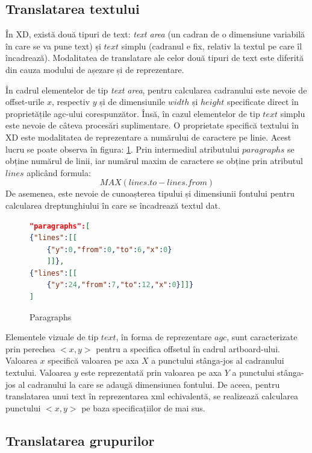\subsection{Translatarea textului}

În XD, există două tipuri de text: \textit{text area} (un cadran de o dimensiune variabilă în care se va pune text) și $text$ simplu (cadranul e fix, relativ la textul pe care îl încadrează). Modalitatea de translatare ale celor două tipuri de text este diferită din cauza modului de așezare și de reprezentare. 

În cadrul elementelor de tip \textit{text area}, pentru calcularea cadranului este nevoie de offset-urile $x$, respectiv $y$ și de dimensiunile $width$ și $height$ specificate direct în proprietățile agc-ului corespunzător. Însă, în cazul elementelor de tip $text$ simplu este nevoie de câteva procesări suplimentare.
O proprietate specifică textului în XD este modalitatea de reprezentare a numărului de caractere pe linie. Acest lucru se poate observa în figura: \ref{fig:Paragraphs}. Prin intermediul atributului $paragraphs$ se obține numărul de linii, iar numărul maxim de caractere se obține prin atributul $lines$ aplicând formula:  \[MAX(lines.to - lines.from)\] De asemenea, este nevoie de cunoașterea tipului și dimensiunii fontului pentru calcularea dreptunghiului în care se încadrează textul dat.

\begin{figure}[!htbp]
\begin{lstlisting}[language=json,firstnumber=1]
"paragraphs":[
{"lines":[[
    {"y":0,"from":0,"to":6,"x":0}
    ]]},
{"lines":[[
    {"y":24,"from":7,"to":12,"x":0}]]}
]
\end{lstlisting}
\caption{Paragraphs} \label{fig:Paragraphs}
\end{figure}

Elementele vizuale de tip $text$, în forma de reprezentare $agc$, sunt caracterizate prin perechea $<x, y>$ pentru a specifica offsetul în cadrul artboard-ului. Valoarea $x$ specifică valoarea pe axa $X$ a punctului stânga-jos al cadranului textului. Valoarea $y$ este reprezentată prin valoarea pe axa $Y$ a punctului stânga-jos al cadranului la care se adaugă dimensiunea fontului. De aceea, pentru translatarea unui text în reprezentarea xml echivalentă, se realizează calcularea punctului $<x, y>$ pe baza specificațiilor de mai sus.

\subsection{Translatarea grupurilor}

